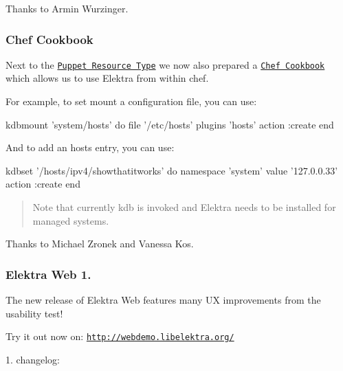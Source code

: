 Thanks to Armin Wurzinger.

\subsubsection*{Chef Cookbook}

Next to the \href{http://puppet.libelektra.org/}{\tt Puppet Resource Type} we now also prepared a \href{https://supermarket.chef.io/cookbooks/kdb}{\tt Chef Cookbook} which allows us to use Elektra from within chef.

For example, to set mount a configuration file, you can use\+:


\begin{DoxyCode}
kdbmount 'system/hosts' do
        file '/etc/hosts'
        plugins 'hosts'
        action :create
end
\end{DoxyCode}


And to add an hosts entry, you can use\+:


\begin{DoxyCode}
kdbset '/hosts/ipv4/showthatitworks' do
        namespace 'system'
        value '127.0.0.33'
        action :create
end
\end{DoxyCode}


\begin{quote}
Note that currently {\ttfamily kdb} is invoked and Elektra needs to be installed for managed systems. \end{quote}


Thanks to Michael Zronek and Vanessa Kos.

\subsubsection*{Elektra Web 1.}

The new release of Elektra Web features many UX improvements from the usability test!

\href{https://www.youtube.com/watch?v=lLg9sk6Hx-E}{\tt }

Try it out now on\+: \href{http://webdemo.libelektra.org/}{\tt http\+://webdemo.\+libelektra.\+org/}

1. changelog\+:


